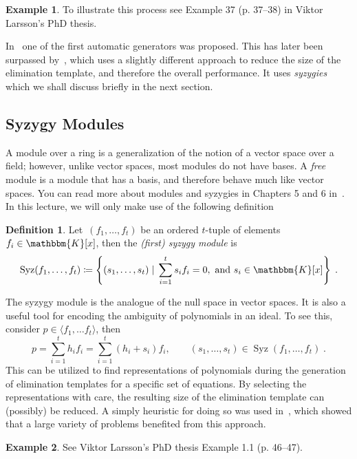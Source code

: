 \documentclass[11pt,a4paper]{article}
\theoremstyle{definition}
\newtheorem{example}{Example}
\newtheorem{definition}{Definition}
\newcommand{\te}[1]{\text{#1}}
\newcommand{\K}{\ensuremath{\mathbbm{K}}}
\DeclareMathOperator{\syz}{Syz}
\begin{document}
\begin{example}
To illustrate this process see Example 37 (p. 37--38) in Viktor Larsson's PhD thesis.
\end{example}



In~\cite{kukelova2008} one of the first automatic generators was proposed.
This has later been surpassed by~\cite{larsson2017cvpr}, which uses a slightly
different approach to reduce the size of the elimination template, and therefore the overall
performance. It uses \emph{syzygies} which we shall discuss briefly in the next section.

\subsection{Syzygy Modules}
A module over a ring is a generalization of the notion of a vector space over a field; however,
unlike vector spaces, most modules do not have bases.
A \emph{free} module is a module that has a basis, and therefore behave much like vector spaces.
You can read more about modules and syzygies in Chapters 5 and 6 in~\cite{cox2}.
In this lecture, we will only make use of the following definition
\begin{definition}
Let~$(f_1,\ldots,f_t)$ be an ordered $t$-tuple of elements
$f_i\in\K[x]$, then the \emph{(first) syzygy module} is
\begin{equation}
\syz(f_1,\ldots,f_t) \coloneqq \left\{
    (s_1,\ldots,s_t)\;|\; \sum_{i=1}^t s_if_i=0, \te{ and } s_i\in\K[x]
\right\}\;.
\end{equation}
\end{definition}
The syzygy module is the analogue of the null space in vector spaces. It is also a useful tool
for encoding the ambiguity of polynomials in an ideal. To see this, consider
$p\in \langle f_1,\ldots f_t\rangle$, then
\begin{equation}
    p = \sum_{i=1}^t h_if_i = \sum_{i=1}^t (h_i+s_i)f_i, \qquad (s_1,\ldots,s_t)\in\syz(f_1,\ldots,f_t)\;.
\end{equation}
This can be utilized to find representations of polynomials during the generation of elimination
templates for a specific set of equations. By selecting the representations with care,
the resulting size of the elimination template can (possibly) be reduced. A simply heuristic for
doing so was used in~\cite{larsson2017cvpr}, which showed that a large variety of problems benefited
from this approach.

\begin{example}
See Viktor Larsson's PhD thesis Example 1.1 (p. 46--47).
\end{example}
\end{document}
